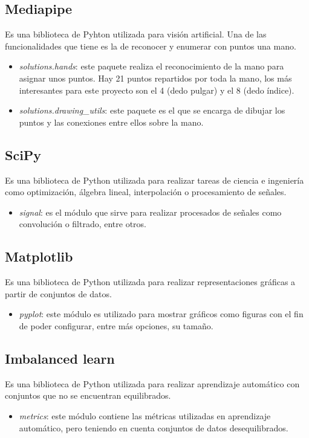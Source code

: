 \subsection{Mediapipe}\label{lib:mediapipe}
Es una biblioteca de Pyhton utilizada para visión artificial. Una de las funcionalidades que tiene es la de reconocer y enumerar con puntos una mano.
\begin{itemize}
	\item \textit{solutions.hands}: este paquete realiza el reconocimiento de la mano para asignar unos puntos. Hay 21 puntos repartidos por toda la mano, los más interesantes para este proyecto son el 4 (dedo pulgar) y el 8 (dedo índice). \cite{mediapipehands}
	\item \textit{solutions.drawing\_utils}: este paquete es el que se encarga de dibujar los puntos y las conexiones entre ellos sobre la mano.
\end{itemize}

\subsection{SciPy}
Es una biblioteca de Python utilizada para realizar tareas de ciencia e ingeniería como optimización, álgebra lineal, interpolación o procesamiento de señales.~\cite{wiki:scipy}
\begin{itemize}
	\item \textit{signal}: es el módulo que sirve para realizar procesados de señales como convolución o filtrado, entre otros.~\cite{scipysignal}
\end{itemize}

\subsection{Matplotlib}
Es una biblioteca de Python utilizada para realizar representaciones gráficas a partir de conjuntos de datos.
\begin{itemize}
	\item \textit{pyplot}: este módulo es utilizado para mostrar gráficos como figuras con el fin de poder configurar, entre más opciones, su tamaño. \cite{plt}
\end{itemize}

\subsection{Imbalanced learn}
Es una biblioteca de Python utilizada para realizar aprendizaje automático con conjuntos que no se encuentran equilibrados.
\begin{itemize}
	\item \textit{metrics}: este módulo contiene las métricas utilizadas en aprendizaje automático, pero teniendo en cuenta conjuntos de datos desequilibrados. \cite{imblearn}
\end{itemize}

